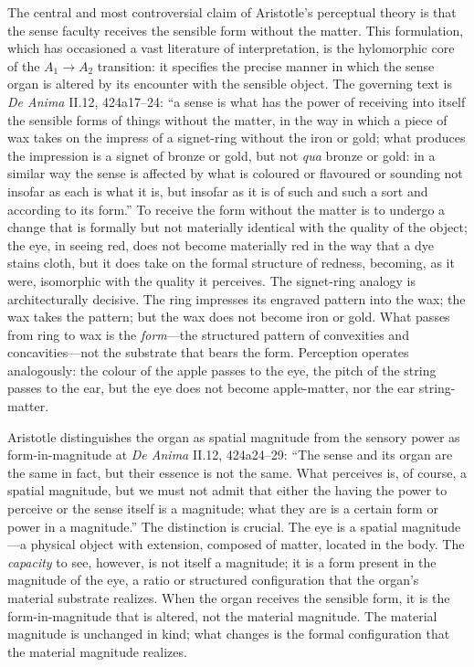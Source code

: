\documentclass[12pt]{article}
\begin{document}
The central and most controversial claim of Aristotle's perceptual theory is that the sense faculty receives the sensible form without the matter. This formulation, which has occasioned a vast literature of interpretation, is the hylomorphic core of the $A_1 \to A_2$ transition: it specifies the precise manner in which the sense organ is altered by its encounter with the sensible object. The governing text is \textit{De Anima} II.12, 424a17--24: ``a sense is what has the power of receiving into itself the sensible forms of things without the matter, in the way in which a piece of wax takes on the impress of a signet-ring without the iron or gold; what produces the impression is a signet of bronze or gold, but not \textit{qua} bronze or gold: in a similar way the sense is affected by what is coloured or flavoured or sounding not insofar as each is what it is, but insofar as it is of such and such a sort and according to its form.'' To receive the form without the matter is to undergo a change that is formally but not materially identical with the quality of the object; the eye, in seeing red, does not become materially red in the way that a dye stains cloth, but it does take on the formal structure of redness, becoming, as it were, isomorphic with the quality it perceives. The signet-ring analogy is architecturally decisive. The ring impresses its engraved pattern into the wax; the wax takes the pattern; but the wax does not become iron or gold. What passes from ring to wax is the \textit{form}---the structured pattern of convexities and concavities---not the substrate that bears the form. Perception operates analogously: the colour of the apple passes to the eye, the pitch of the string passes to the ear, but the eye does not become apple-matter, nor the ear string-matter.

Aristotle distinguishes the organ as spatial magnitude from the sensory power as form-in-magnitude at \textit{De Anima} II.12, 424a24--29: ``The sense and its organ are the same in fact, but their essence is not the same. What perceives is, of course, a spatial magnitude, but we must not admit that either the having the power to perceive or the sense itself is a magnitude; what they are is a certain form or power in a magnitude.'' The distinction is crucial. The eye is a spatial magnitude---a physical object with extension, composed of matter, located in the body. The \textit{capacity} to see, however, is not itself a magnitude; it is a form present in the magnitude of the eye, a ratio or structured configuration that the organ's material substrate realizes. When the organ receives the sensible form, it is the form-in-magnitude that is altered, not the material magnitude. The material magnitude is unchanged in kind; what changes is the formal configuration that the material magnitude realizes.
\end{document}
